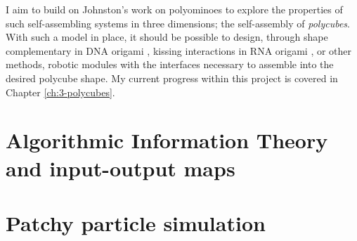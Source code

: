 I aim to build on Johnston's work on polyominoes to explore the properties of such self-assembling systems in three dimensions; the self-assembly of \emph{polycubes}. With such a model in place, it should be possible to design, through shape complementary in DNA origami \cite{wagenbauer2017gigadalton}, kissing interactions in RNA origami \cite{geary2014single}, or other methods, robotic modules with the interfaces necessary to assemble into the desired polycube shape. My current progress within this project is covered in Chapter \ref{ch:3-polycubes}.

\section{Algorithmic Information Theory and input-output maps}

\section{Patchy particle simulation}
